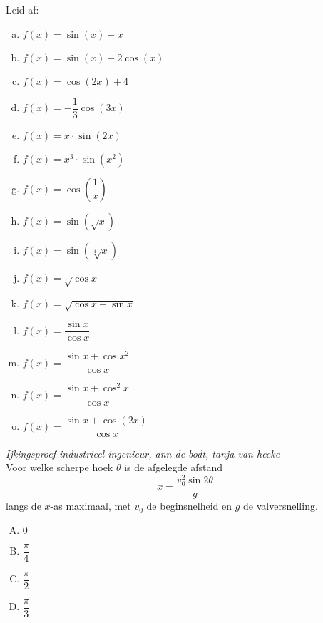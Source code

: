 \documentclass[12pt]{article}
\begin{document}
\begin{oefening}
Leid af:
\begin{multicols}{2}
\begin{enumerate}[(a)]
  \itemsep0.5em
  \item $f(x)=\sin(x)+x$
  \item $f(x)=\sin(x)+2\cos(x)$
  \item $f(x)=\cos(2x)+4$
  \item $f(x)=-\dfrac{1}{3}\cos(3x)$
  \item $f(x)=x\cdot\sin(2x)$
  \item $f(x)=x^3\cdot\sin(x^2)$
  \item $f(x)=\cos(\dfrac{1}{x})$
  \item $f(x)=\sin(\sqrt{x})$
  \item $f(x)=\sin(\sqrt[4]{x})$
  \item $f(x)=\sqrt{\cos x}$
  \item $f(x)=\sqrt{\cos x+\sin x}$
  \item $f(x)=\dfrac{\sin x}{\cos x}$
  \item $f(x)=\dfrac{\sin x + \cos x^2}{\cos x}$
  \item $f(x)=\dfrac{\sin x + \cos^2 x}{\cos x}$
  \item $f(x)=\dfrac{\sin x + \cos(2x)}{\cos x}$
\end{enumerate}
\end{multicols}
\end{oefening}

\begin{oefening}
{\em \scriptsize Ijkingsproef industrieel ingenieur, ann de bodt, tanja van hecke}\\
Voor welke scherpe hoek $\theta$ is de afgelegde afstand
$$x=\dfrac{v^2_0 \sin 2\theta}{g}$$
langs de $x$-as maximaal, met $v_0$ de beginsnelheid en $g$ de valversnelling.
\begin{enumerate}[(A)]
  \itemsep.3em
  \item $0$
  \item $\dfrac{\pi}{4}$
  \item $\dfrac{\pi}{2}$
  \item $\dfrac{\pi}{3}$
\end{enumerate}
\end{oefening}

\end{document}
